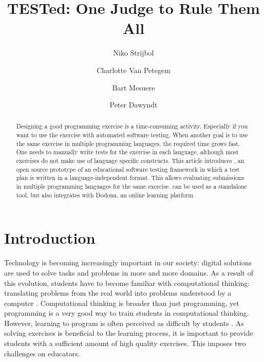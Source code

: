\documentclass[5p,number]{elsarticle}
\title{TESTed: One Judge to Rule Them All}
\author{Niko Strijbol\fnref{fn2}}
\author{Charlotte Van Petegem\fnref{fn2}}
\author{Bart Mesuere\fnref{fn2}}
\author{Peter Dawyndt\fnref{fn2}}
\begin{document}
    \setmainfont[Ligatures=TeX,Numbers=OldStyle,Contextuals=Alternate]{Libertinus Serif}
    \setsansfont[Ligatures=TeX,Numbers=OldStyle,Contextuals=Alternate]{Libertinus Sans}
    \setmonofont[Scale=MatchLowercase,Contextuals={Alternate}]{Jetbrains Mono}

    \begin{abstract}
        Designing a good programming exercise is a time-consuming activity.
        Especially if you want to use the exercise with automated software testing.
        When another goal is to use the same exercise in multiple programming languages, the required time grows fast.
        One needs to manually write tests for the exercise in each language, although most exercises do not make use of language specific constructs.
        This article introduces \tested{}, an open source prototype of an educational software testing framework in which a test plan is written in a language-independent format.
        This allows evaluating submissions in multiple programming languages for the same exercise.
        \tested{} can be used as a standalone tool, but also integrates with Dodona, an online learning platform.
    \end{abstract}

    \maketitle

    \section{Introduction}\label{sec:introduction}

    \noindent
    Technology is becoming increasingly important in our society: digital solutions are used to solve tasks and problems in more and more domains.
    As a result of this evolution, students have to become familiar with computational thinking: translating problems from the real world into problems understood by a computer \cite{bastiaensen2017}.
    Computational thinking is broader than just programming, yet programming is a very good way to train students in computational thinking.
    However, learning to program is often perceived as difficult by students \cite{10.1145/3293881.3295779}.
    As solving exercises is beneficial to the learning process, it is important to provide students with a sufficient amount of high quality exercises.
    This imposes two challenges on educators.
    
\end{document}

